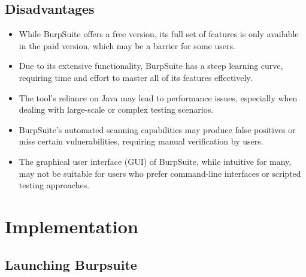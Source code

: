 \documentclass[11pt]{article}
\begin{document}
\subsection{Disadvantages}
\begin{itemize}
    \item While BurpSuite offers a free version, its full set of features is only available in the paid version, which may be a barrier for some users.
    \item Due to its extensive functionality, BurpSuite has a steep learning curve, requiring time and effort to master all of its features effectively.
    \item The tool's reliance on Java may lead to performance issues, especially when dealing with large-scale or complex testing scenarios.
    \item BurpSuite's automated scanning capabilities may produce false positives or miss certain vulnerabilities, requiring manual verification by users.
    \item The graphical user interface (GUI) of BurpSuite, while intuitive for many, may not be suitable for users who prefer command-line interfaces or scripted testing approaches.
\end{itemize}


\section{Implementation}

\subsection{Launching Burpsuite}



\end{document}
